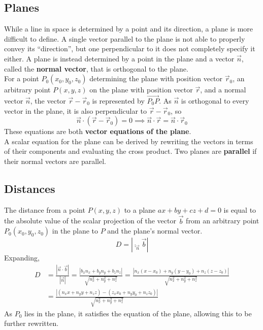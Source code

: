 \documentclass[../Calculus_\Roman{3}]{subfiles}
\begin{document}
					\subsection*{Planes}
						While a line in space is determined by a point and its direction, a plane is more difficult to define. A single vector parallel to the plane is not able to properly convey its \enquote{direction}, but one perpendicular to it does not completely specify it either. A plane is instead determined by a point in the plane and a vector $\vec{n}$, called the \textbf{normal vector}, that is orthogonal to the plane. \\
						For a point $P_0(x_0, y_0, z_0)$ determining the plane with position vector $\vec{r}_0$, an arbitrary point $P(x, y, z)$ on the plane with position vector $\vec{r}$, and a normal vector $\vec{n}$, the vector $\vec{r} - \vec{r}_0$ is represented by $\Vec{P_0P}$. As $\vec{n}$ is orthogonal to every vector in the plane, it is also perpendicular to $\vec{r} - \vec{r}_0$, so
							\[\vec{n} \cdot (\vec{r} - \vec{r}_0) = 0 \implies \vec{n}\cdot \vec{r} = \vec{n} \cdot \vec{r}_0\]
						These equations are both \textbf{vector equations of the plane}. \\
						A scalar equation for the plane can be derived by rewriting the vectors in terms of their components and evaluating the cross product.
						Two planes are \textbf{parallel} if their normal vectors are parallel.
					\subsection*{Distances}
						The distance from a point $P(x, y, z)$ to a plane $ax + by + cz + d = 0$ is equal to the absolute value of the scalar projection of the vector $\vec{b}$ from an arbitrary point $P_0(x_0, y_0, z_0)$ in the plane to $P$ and the plane's normal vector. \\
							\[D = |\comp_{\vec{n}}\vec{b}|\]
						Expanding, 
							\begin{align*}
								D &= \frac{|\vec{n} \cdot \vec{b}|}{|\vec{n}|}
										= \frac{|b_xn_x + b_yn_y + b_zn_z|}{\sqrt{n_x^2 + n_y^2 + n_z^2}}
										= \frac{|n_x(x - x_0) + n_y(y - y_0) + n_z(z - z_0)|}{\sqrt{n_x^2 + n_y^2 + n_z^2}} \\
									&= \frac{|(n_xx + n_yy + n_zz) - (z_xx_0 + n_yy_0 + n_zz_0)|}{\sqrt{n_x^2 + n_y^2 + n_z^2}}
							\end{align*}
						As $P_0$ lies in the plane, it satisfies the equation of the plane, allowing this to be further rewritten.
\end{document}
